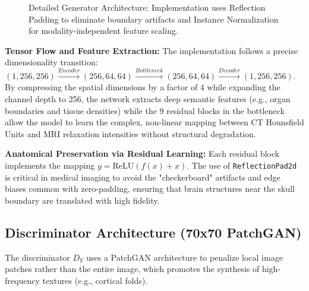 \documentclass[10pt,a4paper]{article}
\begin{document}
\begin{figure}[H]
{
}
\caption{Detailed Generator Architecture: Implementation uses Reflection Padding to eliminate boundary artifacts and Instance Normalization for modality-independent feature scaling.}
\end{figure}

\textbf{Tensor Flow and Feature Extraction:} 
The implementation follows a precise dimensionality transition: $(1, 256, 256) \xrightarrow{Encoder} (256, 64, 64) \xrightarrow{Bottleneck} (256, 64, 64) \xrightarrow{Decoder} (1, 256, 256)$. By compressing the spatial dimensions by a factor of 4 while expanding the channel depth to 256, the network extracts deep semantic features (e.g., organ boundaries and tissue densities) while the 9 residual blocks in the bottleneck allow the model to learn the complex, non-linear mapping between CT Hounsfield Units and MRI relaxation intensities without structural degradation.

\textbf{Anatomical Preservation via Residual Learning:} 
Each residual block implements the mapping $y = \text{ReLU}(f(x) + x)$. The use of \texttt{ReflectionPad2d} is critical in medical imaging to avoid the "checkerboard" artifacts and edge biases common with zero-padding, ensuring that brain structures near the skull boundary are translated with high fidelity.

\subsection{Discriminator Architecture (70x70 PatchGAN)}
The discriminator $D_{Y}$ uses a PatchGAN architecture to penalize local image patches rather than the entire image, which promotes the synthesis of high-frequency textures (e.g., cortical folds).
\end{document}
